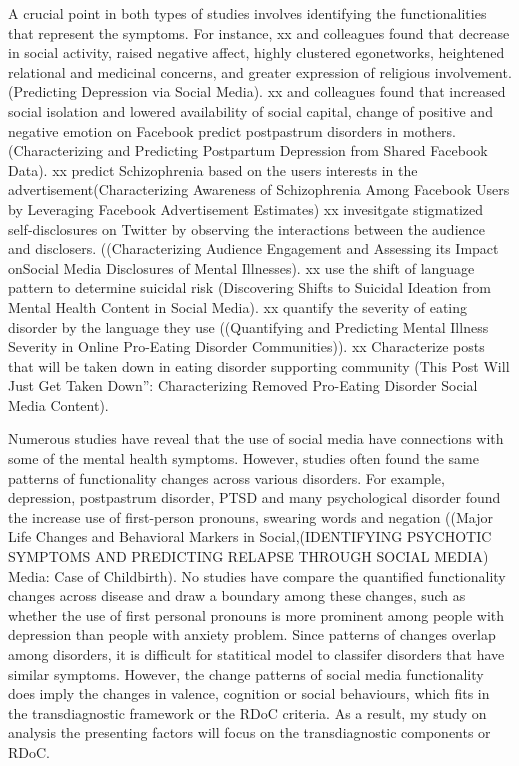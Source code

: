 A crucial point in both types of studies involves identifying the functionalities that represent the symptoms. For instance, xx and colleagues found that decrease in social activity, raised negative affect, highly clustered egonetworks, heightened relational and medicinal concerns, and greater expression of religious involvement.(Predicting Depression via Social Media). xx and colleagues found that increased social isolation and lowered availability of social capital, change of positive and negative emotion on Facebook predict postpastrum disorders in mothers. (Characterizing and Predicting Postpartum Depression from Shared Facebook Data). xx predict Schizophrenia based on the users interests in the advertisement(Characterizing Awareness of Schizophrenia Among Facebook Users by Leveraging Facebook Advertisement Estimates) xx invesitgate stigmatized self-disclosures on Twitter by observing the interactions between the audience and disclosers. ((Characterizing Audience Engagement and Assessing its Impact onSocial Media Disclosures of Mental Illnesses). xx use the shift of language pattern to determine suicidal risk
(Discovering Shifts to Suicidal Ideation from Mental Health Content in Social Media). xx quantify the severity of eating disorder by the language they use ((Quantifying and Predicting Mental Illness Severity in Online Pro-Eating Disorder Communities)). xx Characterize posts that will be taken down in eating disorder supporting community (This Post Will Just Get Taken Down”: Characterizing Removed Pro-Eating Disorder Social Media Content).


Numerous studies have reveal that the use of social media have connections with some of the mental health symptoms. However, studies often found the same patterns of functionality changes across various disorders. For example, depression, postpastrum disorder, PTSD and many psychological disorder found the increase use of first-person pronouns, swearing words and negation ((Major Life Changes and Behavioral Markers in Social,(IDENTIFYING PSYCHOTIC SYMPTOMS AND PREDICTING RELAPSE THROUGH SOCIAL MEDIA) Media: Case of Childbirth). No studies have compare the quantified functionality changes across disease and draw a boundary among these changes, such as whether the use of first personal pronouns is more prominent among people with depression than people with anxiety problem. Since patterns of changes overlap among disorders, it is difficult for statitical model to classifer disorders that have similar symptoms. However, the change patterns of social media functionality does imply the changes in valence, cognition or social behaviours, which fits in the transdiagnostic framework or the RDoC criteria. As a result, my study on analysis the presenting factors will focus on the transdiagnostic components or RDoC.



